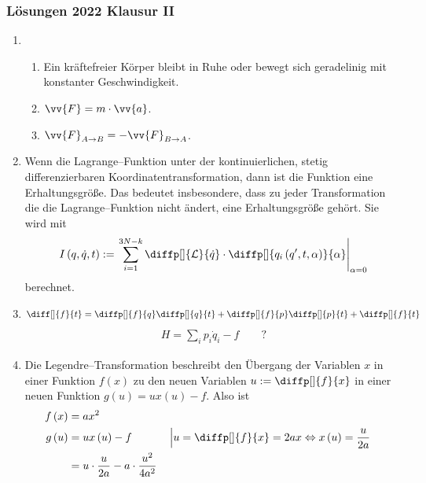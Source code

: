 \documentclass[a4paper,12pt]{article}
\numberwithin{equation}{section}
\begin{document}
\newpage
\subsubsection{Lösungen 2022 Klausur II}
\begin{enumerate}[label=\arabic*.]
        \item \begin{enumerate}[label=\alph*)]
                \item Ein kräftefreier Körper bleibt in Ruhe oder bewegt sich geradelinig mit konstanter Geschwindigkeit.
                \item $\vv{F}=m\cdot \vv{a}$.
                \item $\vv{F}_{A\rightarrow B}=-\vv{F}_{B\rightarrow A}$.
        \end{enumerate}
        \item Wenn die Lagrange--Funktion unter der kontinuierlichen, stetig differenzierbaren Koordinatentransformation, dann ist die Funktion eine Erhaltungsgröße. Das bedeutet insbesondere, dass zu jeder Transformation die die Lagrange--Funktion nicht ändert, eine Erhaltungsgröße gehört. Sie wird mit
                \begin{align*} 
                I\left(q,\dot{q},t\right):=\left.\sum_{i=1}^{3N-k}\diffp[]{\mathcal{L}}{\dot{q}}\cdot \diffp[]{q_i\left(q',t,\alpha \right)}{\alpha }\right|_{\alpha =0}
                \end{align*} 
                berechnet.
        \item \begin{align*} 
        \diff[]{f}{t}=\diffp[]{f}{q}\diffp[]{q}{t}+\diffp[]{f}{p}\diffp[]{p}{t}+\diffp[]{f}{t}
        \end{align*} 
        \begin{align*} 
                H=\sum_{i}^{}p_i\dot{q}_i-f\qquad ?
        \end{align*} 
        \item Die Legendre--Transformation beschreibt den Übergang der Variablen $x$ in einer Funktion $f\left(x\right)$ zu den neuen Variablen $u:=\diffp[]{f}{x}$ in einer neuen Funktion $g\left(u\right)=ux\left(u\right)-f$. Also ist
                \begin{align*} 
                        f\left(x\right)&=ax^2\\
                        g\left(u\right)&=ux\left(u\right)-f&&\left|u=\diffp[]{f}{x}=2ax\Leftrightarrow x\left(u\right)=\dfrac{u}{2a}\right.\\
                                       &=u\cdot \dfrac{u}{2a}-a\cdot \dfrac{u^2}{4a^2}\\

\end{align*}
\end{enumerate}
\end{document}
